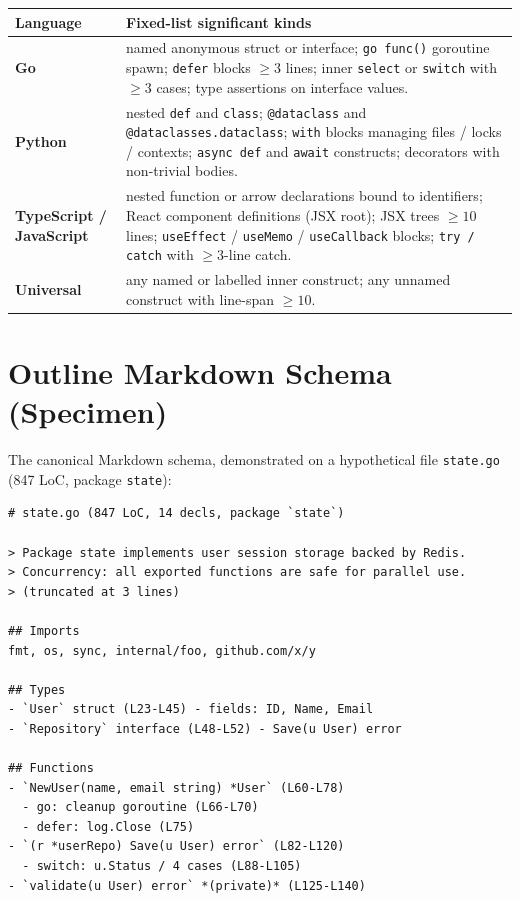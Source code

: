 \begin{center}
\begin{tabular}{p{2.2cm}p{10cm}}
\toprule
Language & Fixed-list significant kinds \\
\midrule
\textbf{Go} & named anonymous struct or interface; \texttt{go func()} goroutine
              spawn; \texttt{defer} blocks $\geq 3$ lines; inner
              \texttt{select} or \texttt{switch} with $\geq 3$ cases; type
              assertions on interface values. \\
\textbf{Python} & nested \texttt{def} and \texttt{class}; \texttt{@dataclass}
              and \texttt{@dataclasses.dataclass}; \texttt{with} blocks
              managing files / locks / contexts; \texttt{async def} and
              \texttt{await} constructs; decorators with non-trivial
              bodies. \\
\textbf{TypeScript / JavaScript} & nested function or arrow declarations
              bound to identifiers; React component definitions (JSX root);
              JSX trees $\geq 10$ lines; \texttt{useEffect} /
              \texttt{useMemo} / \texttt{useCallback} blocks;
              \texttt{try / catch} with $\geq 3$-line catch. \\
\textbf{Universal} & any named or labelled inner construct; any unnamed
              construct with line-span $\geq 10$. \\
\bottomrule
\end{tabular}
\end{center}

\section{Outline Markdown Schema (Specimen)}
\label{app:schema}

The canonical Markdown schema, demonstrated on a hypothetical file
\texttt{state.go} (847 LoC, package \texttt{state}):

\begin{lstlisting}[basicstyle=\ttfamily\small,frame=single]
# state.go (847 LoC, 14 decls, package `state`)

> Package state implements user session storage backed by Redis.
> Concurrency: all exported functions are safe for parallel use.
> (truncated at 3 lines)

## Imports
fmt, os, sync, internal/foo, github.com/x/y

## Types
- `User` struct (L23-L45) - fields: ID, Name, Email
- `Repository` interface (L48-L52) - Save(u User) error

## Functions
- `NewUser(name, email string) *User` (L60-L78)
  - go: cleanup goroutine (L66-L70)
  - defer: log.Close (L75)
- `(r *userRepo) Save(u User) error` (L82-L120)
  - switch: u.Status / 4 cases (L88-L105)
- `validate(u User) error` *(private)* (L125-L140)
\end{lstlisting}

